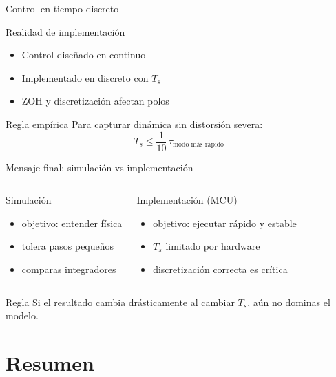\documentclass[aspectratio=169,10pt]{beamer}
\newcommand{\importantbox}[2][Importante]{%
\begin{alertblock}{#1}#2\end{alertblock}}
\begin{document}
\begin{frame}{Control en tiempo discreto}
\small
\begin{block}{Realidad de implementación}
\begin{itemize}
\item Control diseñado en continuo
\item Implementado en discreto con $T_s$
\item ZOH y discretización afectan polos
\end{itemize}
\end{block}

\importantbox[Regla empírica]{
Para capturar dinámica sin distorsión severa:
\[
T_s \le \frac{1}{10}\, \tau_{\text{modo más rápido}}
\]
}
\end{frame}

\begin{frame}{Mensaje final: simulación vs implementación}
\small
\begin{columns}[T]
\begin{block}{Simulación}
\begin{itemize}
\item objetivo: entender física
\item tolera pasos pequeños
\item comparas integradores
\end{itemize}
\end{block}

\begin{block}{Implementación (MCU)}
\begin{itemize}
\item objetivo: ejecutar rápido y estable
\item $T_s$ limitado por hardware
\item discretización correcta es crítica
\end{itemize}
\end{block}
\end{columns}

\importantbox[Regla]{
Si el resultado cambia drásticamente al cambiar $T_s$, aún no dominas el modelo.
}
\end{frame}

\section{Resumen}
\end{document}
